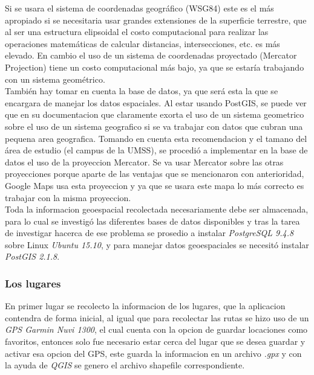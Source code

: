         Si se usara el sistema de coordenadas geográfico (WSG84) este es el más apropiado si se necesitaria usar grandes extensiones de la superficie terrestre, que al ser una estructura elipsoidal el costo computacional para realizar las operaciones matemáticas de calcular distancias, intersecciones, etc. es más elevado. En cambio el uso de un sistema de coordenadas proyectado (Mercator Projection) tiene un costo computacional más bajo, ya que se estaría trabajando con un sistema geométrico.\\

        También hay tomar en cuenta la base de datos, ya que será esta la que se encargara de manejar los datos espaciales. Al estar usando PostGIS, se puede ver que en su documentacion que claramente exorta el uso de un sistema geometrico sobre el uso de un sistema geografico si  se va trabajar con datos que cubran una pequena area geografica. Tomando en cuenta esta recomendacion y el tamano del área de estudio (el campus de la UMSS), se procedió a implementar en la base de datos el uso de la proyeccion Mercator. Se va usar Mercator sobre las otras proyecciones porque aparte de las ventajas que se mencionaron con anterioridad, Google Maps usa esta proyeccion y ya que se usara este mapa lo más correcto es trabajar con la misma proyeccion. \\


        Toda la informacion geoespacial recolectada necesariamente debe ser almacenada, para lo cual se investigó las diferentes bases de datos disponibles y tras la tarea de investigar hacerca de ese problema se prosedio a instalar \emph{PostgreSQL 9.4.8} sobre Linux \emph{Ubuntu 15.10}, y para manejar datos geoespaciales se necesitó instalar \emph{PostGIS 2.1.8}.\\


        \subsubsection{Los lugares}
        \label{subs:Los lugares}

        En primer lugar se recolecto la informacion de los lugares, que la aplicacion contendra  de forma inicial, al igual que para recolectar las rutas se hizo uso de un \emph{GPS Garmin Nuvi 1300}, el cual cuenta con la opcion de guardar locaciones como favoritos, entonces solo fue necesario estar cerca del lugar que se desea guardar y activar esa opcion del GPS, este guarda la informacion en un archivo \emph{.gpx} y con la ayuda de \emph{QGIS} se genero el archivo shapefile correspondiente.\\

